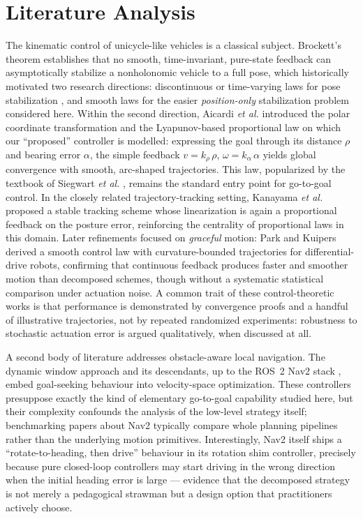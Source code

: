\documentclass[conference]{IEEEtran}
\begin{document}
\section{Literature Analysis}
The kinematic control of unicycle-like vehicles is a classical subject.
Brockett's theorem \cite{brockett1983asymptotic} establishes that no smooth,
time-invariant, pure-state feedback can asymptotically stabilize a
nonholonomic vehicle to a full pose, which historically motivated two research
directions: discontinuous or time-varying laws for pose stabilization
\cite{astolfi1999exponential}, and smooth laws for the easier
\emph{position-only} stabilization problem considered here. Within the second
direction, Aicardi \emph{et al.} \cite{aicardi1995closed} introduced the polar
coordinate transformation and the Lyapunov-based proportional law on which our
``proposed'' controller is modelled: expressing the goal through its distance
$\rho$ and bearing error $\alpha$, the simple feedback
$v=k_\rho\,\rho$, $\omega=k_\alpha\,\alpha$ yields global convergence with
smooth, arc-shaped trajectories. This law, popularized by the textbook of
Siegwart \emph{et al.} \cite{siegwart2011introduction}, remains the standard
entry point for go-to-goal control. In the closely related trajectory-tracking
setting, Kanayama \emph{et al.} \cite{kanayama1990stable} proposed a stable
tracking scheme whose linearization is again a proportional feedback on the
posture error, reinforcing the centrality of proportional laws in this
domain. Later refinements focused on \emph{graceful} motion: Park and Kuipers
\cite{park2011smooth} derived a smooth control law with curvature-bounded
trajectories for differential-drive robots, confirming that continuous
feedback produces faster and smoother motion than decomposed schemes, though
without a systematic statistical comparison under actuation noise. A common
trait of these control-theoretic works is that performance is demonstrated by
convergence proofs and a handful of illustrative trajectories, not by
repeated randomized experiments: robustness to stochastic actuation error is
argued qualitatively, when discussed at all.

A second body of literature addresses obstacle-aware local navigation. The
dynamic window approach \cite{fox1997dynamic} and its descendants, up to the
ROS~2 Nav2 stack \cite{macenski2020marathon}, embed goal-seeking behaviour
into velocity-space optimization. These controllers presuppose exactly the
kind of elementary go-to-goal capability studied here, but their complexity
confounds the analysis of the low-level strategy itself; benchmarking papers
about Nav2 typically compare whole planning pipelines rather than the
underlying motion primitives. Interestingly, Nav2 itself ships a
``rotate-to-heading, then drive'' behaviour in its rotation shim controller,
precisely because pure closed-loop controllers may start driving in the
wrong direction when the initial heading error is large --- evidence that the
decomposed strategy is not merely a pedagogical strawman but a design option
that practitioners actively choose.
\end{document}
